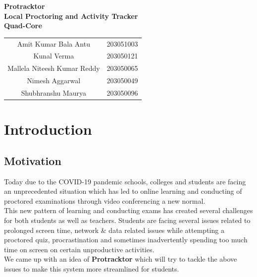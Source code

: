 \documentclass{article}
\begin{document}
\begin{titlepage}

\vspace*{\fill} 
\begin{center} 
    \hline
     \vspace{5mm}
    \Huge{\bfseries Protracktor\\Local Proctoring and Activity Tracker}\\
     \vspace{5mm}
    \hline
    \vspace{10mm}
    \LARGE{\textbf{Quad-Core}}\\
    \vspace{5mm}
    \begin{tabular}{c c}
    Amit Kumar Bala Antu & 203051003\\
    Kunal Verma & 203050121\\
    Mallela Niteesh Kumar Reddy & 203050065\\
    Nimesh Aggarwal & 203050049\\
    Shubhranshu Maurya & 203050096\\
    \end{tabular}

\end{center}
\vspace*{\fill}
\end{titlepage}

\tableofcontents
\newpage


\section{Introduction}

\subsection{Motivation}
Today due to the COVID-19 pandemic schools, colleges and students are facing an unprecedented situation which has led to online learning and conducting of proctored examinations through video conferencing a new normal.\\
This new pattern of learning and conducting exams has created several challenges for both students as well as teachers. Students are facing several issues related to prolonged screen time, network & data related issues while attempting a proctored quiz, procrastination and sometimes inadvertently spending too much time on screen on certain unproductive activities.\\
We came up with an idea of \textbf{Protracktor} which will try to tackle the above issues to make this system more streamlined for students.
\end{document}
